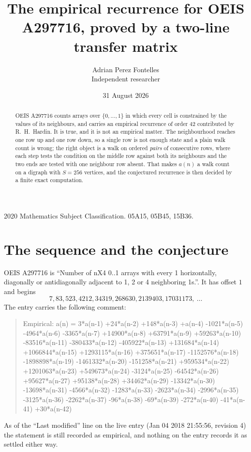 \documentclass[11pt,a4paper]{article}
\title{The empirical recurrence for OEIS A297716, proved by a two-line transfer matrix}
\author{Adrian Perez Fontelles\\ \small Independent researcher}
\date{31 August 2026}
\theoremstyle{plain}
\theoremstyle{definition}
\begin{document}
\maketitle

\begin{abstract}
OEIS A297716 counts arrays over $\{0,\dots,1\}$ in which every cell is constrained by the
values of its neighbours, and carries an empirical recurrence of order $42$ contributed
by R.~H.~Hardin. It is true, and it is not an empirical matter. The neighbourhood reaches one
row up and one row down, so a single row is not enough state and a plain walk count
is wrong; the right object is a walk on ordered \emph{pairs} of consecutive rows, where
each step tests the condition on the middle row against both its neighbours and the two
ends are tested with one neighbour row absent. That makes $a(n)$ a walk count on a digraph
with $S=256$ vertices, and the conjectured recurrence is then decided by a finite exact
computation.
\end{abstract}

\noindent\small 2020 Mathematics Subject Classification. 05A15, 05B45, 15B36.\normalsize

\section{The sequence and the conjecture}

OEIS A297716 is ``Number of nX4 0..1 arrays with every 1 horizontally, diagonally or antidiagonally adjacent to 1, 2 or 4 neighboring 1s.''. It has offset $1$ and begins
\[
7, 83, 523, 4212, 34319, 268630, 2139403, 17031173,\ \dots
\]
The entry carries the following comment:
\begin{quote}\small
Empirical: a(n) = 3*a(n-1) +24*a(n-2) +148*a(n-3) +a(n-4) -1021*a(n-5) -4964*a(n-6) -3365*a(n-7) +14900*a(n-8) +63791*a(n-9) +59263*a(n-10) -83516*a(n-11) -380433*a(n-12) -405922*a(n-13) +131684*a(n-14) +1066844*a(n-15) +1293115*a(n-16) +375651*a(n-17) -1152576*a(n-18) -1898898*a(n-19) -1461332*a(n-20) -151258*a(n-21) +959534*a(n-22) +1201063*a(n-23) +549673*a(n-24) -3124*a(n-25) -64542*a(n-26) +95627*a(n-27) +95138*a(n-28) +34462*a(n-29) -13342*a(n-30) -13698*a(n-31) -4566*a(n-32) -1283*a(n-33) -2623*a(n-34) -2996*a(n-35) -3125*a(n-36) -2262*a(n-37) -96*a(n-38) -69*a(n-39) -272*a(n-40) -41*a(n-41) +30*a(n-42)
\end{quote}
As of the ``Last modified'' line on the live entry (Jan 04 2018 21:55:56, revision 4) the statement is
still recorded as empirical, and nothing on the entry records it as settled either way.
\end{document}
